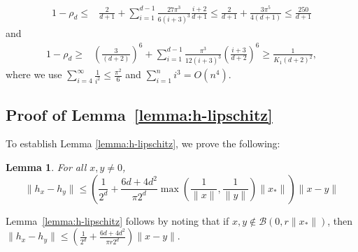 \documentclass[11pt]{article}
\newtheorem{lemma}[theorem]{Lemma}
\begin{document}
\begin{align*}
1 - \rho_d \leq& \frac{2}{d + 1} + \sum_{i = 1}^{d - 1} \frac{27 \pi^3}{6 (i + 3)^3} \frac{i + 2}{d + 1} \leq \frac{2}{d + 1} + \frac{3 \pi^5}{4 (d + 1)} \leq \frac{250}{d + 1}
\end{align*}
and
\begin{align*}
1 - \rho_d \geq& \left(\frac{3}{(d+2)}\right)^6 + \sum_{i = 1}^{d - 1} \frac{\pi^3}{12 (i + 3)^3} \left( \frac{i + 3}{d + 2} \right)^6 \geq \frac{1}{K_1 (d + 2)^2},
\end{align*}
where we use $\sum_{i = 4}^\infty \frac{1}{i^2} \leq \frac{\pi^2}{6}$ and $\sum_{i = 1}^n i^3 = O(n^4)$.




\subsection{\label{sec:prooflemma:h-lipschitz}Proof of Lemma~\ref{lemma:h-lipschitz}}
To establish Lemma \ref{lemma:h-lipschitz}, we prove the following:

\begin{lemma}
\label{GA:le4}
For all $x, y \neq 0$,
\begin{equation*}
\|h_{x} - h_{y}\| \leq \left(\frac{1}{2^d} + \frac{6 d + 4 d^2}{\pi 2^d} \max\left( \frac{1}{\|x\|}, \frac{1}{\|y\|} \right) \|x_*\|\right) \|x - y\|
\end{equation*}
\end{lemma}
%
Lemma~\ref{lemma:h-lipschitz} follows by noting that if $x, y \notin \mathcal{B}(0, r \|x_*\|)$, then $\|h_{x} - h_{y}\| \leq \left(\frac{1}{2^d} + \frac{6 d + 4 d^2}{\pi r 2^d}\right) \|x - y\|$.
\end{document}
